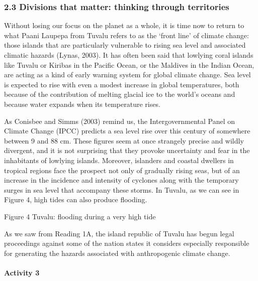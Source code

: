 \documentclass[letterpaper,10pt,english]{sphinxmanual}
\let\sphinxpxdimen\pdfpxdimen\else\newdimen\sphinxpxdimen
\begin{document}
\subsubsection{2.3 Divisions that matter: thinking through territories}
\label{\detokenize{content/session_00/Part_00_02:2.3-Divisions-that-matter:-thinking-through-territories}}
Without losing our focus on the planet as a whole, it is time now to return to what Paani Laupepa from Tuvalu refers to as the ‘front line’ of climate change: those islands that are particularly vulnerable to rising sea level and associated climatic hazards (Lynas, 2003). It has often been said that low\sphinxhyphen{}lying coral islands like Tuvalu or Kiribas in the Pacific Ocean, or the Maldives in the Indian Ocean, are acting as a kind of early warning system for global climate change. Sea level is expected
to rise with even a modest increase in global temperatures, both because of the contribution of melting glacial ice to the world’s oceans and because water expands when its temperature rises.

As Conisbee and Simms (2003) remind us, the Intergovernmental Panel on Climate Change (IPCC) predicts a sea level rise over this century of somewhere between 9 and 88 cm. These figures seem at once strangely precise and wildly divergent, and it is not surprising that they provoke uncertainty and fear in the inhabitants of low\sphinxhyphen{}lying islands. Moreover, islanders and coastal dwellers in tropical regions face the prospect not only of gradually rising seas, but of an increase in the incidence and
intensity of cyclones along with the temporary surges in sea level that accompany these storms. In Tuvalu, as we can see in Figure 4, high tides can also produce flooding.

\sphinxincludegraphics[width=447\sphinxpxdimen,height=285\sphinxpxdimen]{{dd205_3_004i}.jpg}

Figure 4 Tuvalu: flooding during a very high tide

As we saw from Reading 1A, the island republic of Tuvalu has begun legal proceedings against some of the nation states it considers especially responsible for generating the hazards associated with anthropogenic climate change.


\paragraph{Activity 3}
\label{\detokenize{content/session_00/Part_00_02:Activity-3}}
\end{document}
